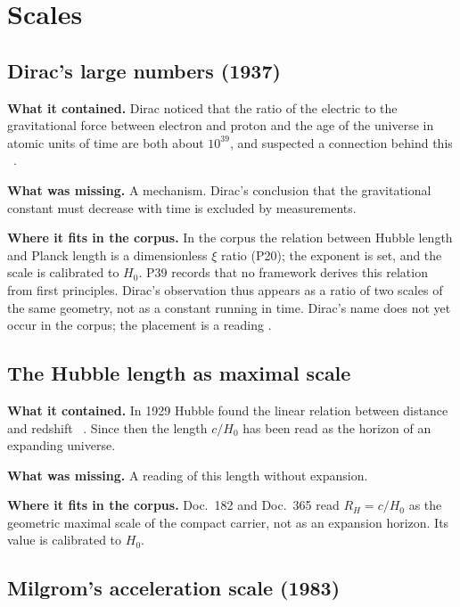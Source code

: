 \section{Scales}

\subsection{Dirac's large numbers (1937)}

\textbf{What it contained.} Dirac noticed that the ratio of the electric to the gravitational force
between electron and proton and the age of the universe in atomic units of time are both about
$10^{39}$, and suspected a connection behind this \QM~\cite{Dirac1937}.

\textbf{What was missing.} A mechanism. Dirac's conclusion that the gravitational constant must
decrease with time is excluded by measurements.

\textbf{Where it fits in the corpus.} In the corpus the relation between Hubble length and Planck
length is a dimensionless $\xi$ ratio (P20); the exponent is set, and the scale is calibrated to
$H_0$. P39 records that no framework derives this relation from first principles. Dirac's
observation thus appears as a ratio of two scales of the same geometry, not as a constant running in
time. Dirac's name does not yet occur in the corpus; the placement is a reading \SM.

\subsection{The Hubble length as maximal scale}

\textbf{What it contained.} In 1929 Hubble found the linear relation between distance and redshift
\QM~\cite{Hubble1929}. Since then the length $c/H_0$ has been read as the horizon of an expanding
universe.

\textbf{What was missing.} A reading of this length without expansion.

\textbf{Where it fits in the corpus.} Doc.~182 and Doc.~365 read $R_H=c/H_0$ as the geometric maximal
scale of the compact carrier, not as an expansion horizon. Its value is calibrated to $H_0$.

\subsection{Milgrom's acceleration scale (1983)}

